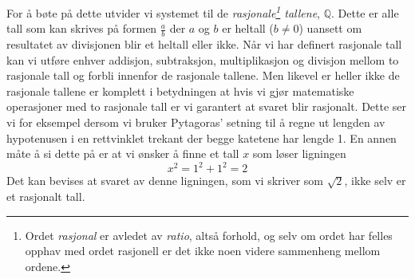 \documentclass[a4paper,norsk,12pt]{article}
\begin{document}
For å bøte på dette utvider vi systemet til de \emph{rasjonale\footnote{Ordet \emph{rasjonal} er avledet av \emph{ratio}, altså forhold, og selv om ordet har felles opphav med ordet rasjonell er det ikke noen videre sammenheng mellom ordene.} tallene}, $\mathbb{Q}$. Dette er alle tall som kan skrives på formen $\frac{a}{b}$ der $a$ og $b$ er heltall ($b\neq0$) uansett om resultatet av divisjonen blir et heltall eller ikke. Når vi har definert rasjonale tall kan vi utføre enhver addisjon, subtraksjon, multiplikasjon og divisjon mellom to rasjonale tall og forbli innenfor de rasjonale tallene. Men likevel er heller ikke de rasjonale tallene er komplett i betydningen at hvis vi gjør matematiske operasjoner med to rasjonale tall er vi garantert at svaret blir rasjonalt. Dette ser vi for eksempel dersom vi bruker Pytagoras' setning til å regne ut lengden av hypotenusen i en rettvinklet trekant der begge katetene har lengde 1. En annen måte å si dette på er at vi ønsker å finne et tall $x$ som løser ligningen
\begin{displaymath}
	x^2 = 1^2 + 1^2 = 2
\end{displaymath}
Det kan bevises at svaret av denne ligningen, som vi skriver som $\sqrt{2}$, ikke selv er et rasjonalt tall.

\end{document}
